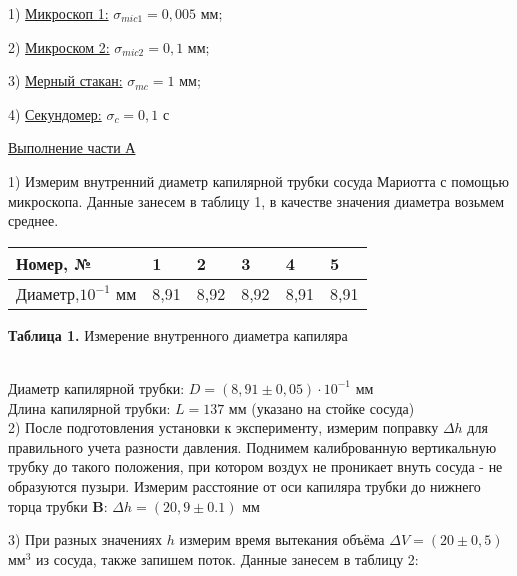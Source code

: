\documentclass{article}
\begin{document}
1) \underline {Микроскоп 1:}  \indent  \indent \(\sigma_{mic1} = 0,005\) мм;

2) \underline {Микроском 2:}  \indent  \indent \(\sigma_{mic2} = 0,1\) мм;

3) \underline {Мерный стакан:} \indent  \(\sigma_{mc} = 1\) мм;

4) \underline {Секундомер:}   \indent  \indent \(\sigma_{c} = 0,1\) с

\newpage

\begin{center}
    \raggedleft
    {
        \large{\underline{Выполнение части А}}
    }
\end{center}

1) Измерим внутренний диаметр капилярной трубки сосуда Мариотта с помощью микроскопа. Данные занесем в таблицу 1, в качестве значения диаметра возьмем среднее.

\begin{center}
    \begin{tabular}{|m{10em}|m{2em}|m{2em}|m{2em}|m{2em}|m{2em}|}
        \hline
        Номер, № & 1 & 2& 3 & 4 & 5 \\
        \hline
        Диаметр,\(10^{-1}\) мм & 8,91 & 8,92 & 8,92 & 8,91 & 8,91 \\
        \hline
    \end{tabular}
\end{center}
\begin{center}
    \textbf {Таблица 1.} Измерение внутренного диаметра капиляра
\end{center} \\
Диаметр капилярной трубки: \(D = (8,91 \pm 0,05)\cdot 10^{-1}\) мм \\
Длина капилярной трубки: \(L = 137\) мм (указано на стойке сосуда) \\

2) После подготовления установки к эксперименту, измерим поправку \(\Delta h\) для правильного учета разности давления. Поднимем калиброванную вертикальную трубку до такого положения, при котором воздух не проникает внуть сосуда - не образуются пузыри. Измерим расстояние от оси капиляра трубки до нижнего торца трубки \textbf{B}: \(\Delta h = (20,9 \pm 0.1)\) мм

3) При разных значениях \(h\) измерим время вытекания объёма \(\Delta V = (20 \pm 0,5)\) мм\(^{3}\) из сосуда, также запишем поток. Данные занесем в таблицу 2:
\end{document}
